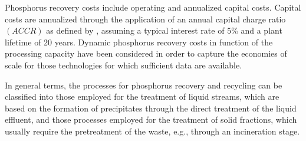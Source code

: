 \documentclass[authoryear]{elsarticle}
\begin{document}
Phosphorus recovery costs include operating and annualized capital costs. Capital costs are annualized through the application of an annual capital charge ratio $\left( ACCR\right)$ as defined by \citet{towler2013chemical}, assuming a typical interest rate of 5\% and a plant lifetime of 20 years. Dynamic phosphorus recovery costs in function of the processing capacity have been considered in order to capture the economies of scale for those technologies for which sufficient data are available.

In general terms, the processes for phosphorus recovery and recycling can be classified into those employed for the treatment of liquid streams, which are based on the formation of precipitates through the direct treatment of the liquid effluent, and those processes employed for the treatment of solid fractions, which usually require the pretreatment of the waste, e.g., through an incineration stage.
\end{document}
